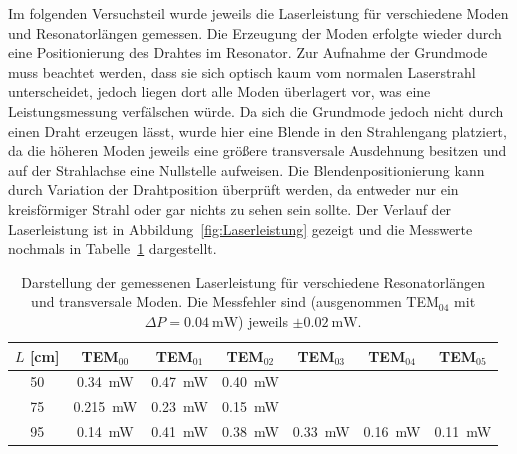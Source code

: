 \documentclass[a4paper,twoside,final]{article}
\begin{document}
Im folgenden Versuchsteil wurde jeweils die Laserleistung für verschiedene Moden und Resonatorlängen gemessen. Die Erzeugung der Moden erfolgte wieder durch eine Positionierung des Drahtes im Resonator. Zur Aufnahme der Grundmode muss beachtet werden, dass sie sich optisch kaum vom normalen Laserstrahl unterscheidet, jedoch liegen dort alle Moden überlagert vor, was eine Leistungsmessung verfälschen würde. Da sich die Grundmode jedoch nicht durch einen Draht erzeugen lässt, wurde hier eine Blende in den Strahlengang platziert, da die höheren Moden jeweils eine größere transversale Ausdehnung besitzen und auf der Strahlachse eine Nullstelle aufweisen. Die Blendenpositionierung kann durch Variation der Drahtposition überprüft werden, da entweder nur ein kreisförmiger Strahl oder gar nichts zu sehen sein sollte. Der Verlauf der Laserleistung ist in Abbildung~\ref{fig:Laserleistung} gezeigt und die Messwerte nochmals in Tabelle~\ref{tab:Laserleistung} dargestellt.

\begin{table}[htp]
  \centering
  \caption{Darstellung der gemessenen Laserleistung für verschiedene Resonatorlängen und transversale Moden. Die Messfehler sind (ausgenommen TEM$_{04}$ mit $\Delta P =\SI{0.04}{\milli\watt}$) jeweils $\pm \SI{0.02}{\milli\watt}$.}
  \begin{tabular}{c c c c c c c }
    \toprule
    $L$ [\si{\centi\metre}] & TEM$_{00}$& TEM$_{01}$& TEM$_{02}$ & TEM$_{03}$& TEM$_{04}$& TEM$_{05}$ \\
    \midrule
    50 &\SI{0.34}{\milli\watt} & \SI{0.47}{\milli\watt} & \SI{0.40}{\milli\watt} & & &\\
    75 & \SI{0.215}{\milli\watt} & \SI{0.23}{\milli\watt} & \SI{0.15}{\milli\watt} & & &\\
    95 &\SI{0.14}{\milli\watt} & \SI{0.41}{\milli\watt} & \SI{0.38}{\milli\watt} & \SI{0.33}{\milli\watt} & \SI{0.16}{\milli\watt} & \SI{0.11}{\milli\watt}\\
    \bottomrule
  \end{tabular}
  \label{tab:Laserleistung}
\end{table}


\end{document}
